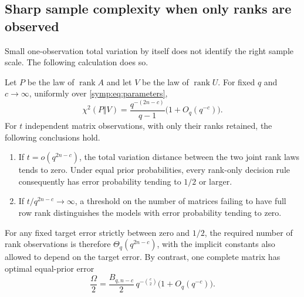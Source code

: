 \subsection{Sharp sample complexity when only ranks are observed}

Small one-observation total variation by itself does not identify the right
sample scale.  The following calculation does so.

\begin{theorem}
\label{symp:thm:sample}
Let $P$ be the law of $\operatorname{rank}A$ and let $V$ be the law of
$\operatorname{rank}U$.  For fixed $q$ and $c\to\infty$, uniformly over
\eqref{symp:eq:parameters},
\begin{equation}
 \chi^2(P\Vert V)
  =\frac{q^{-(2n-c)}}{q-1}\bigl(1+O_q(q^{-c})\bigr).
 \label{symp:eq:chi-square}
\end{equation}
For $t$ independent matrix observations, with only their ranks retained,
the following conclusions hold.
\begin{enumerate}
\item If $t=o(q^{2n-c})$, the total variation distance between the two
 joint rank laws tends to zero.  Under equal prior probabilities, every
 rank-only decision rule consequently has error probability tending to
 $1/2$ or larger.
\item If $t/q^{2n-c}\to\infty$, a threshold on the number of matrices
 failing to have full row rank distinguishes the models with error
 probability tending to zero.
\end{enumerate}
For any fixed target error strictly between zero and $1/2$, the required
number of rank observations is therefore $\Theta_q(q^{2n-c})$, with the
implicit constants also allowed to depend on the target error.
By contrast, one complete matrix has optimal equal-prior error
\begin{equation}
 \frac{\Omega}{2}
 =\frac{B_{q,n-c}}2\,q^{-\binom c2}
      \bigl(1+O_q(q^{-c})\bigr).
 \label{symp:eq:one-matrix-risk}
\end{equation}
\end{theorem}

